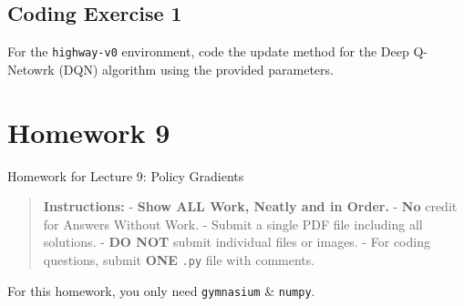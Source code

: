 \documentclass[
  letterpaper,
  DIV=11,
  numbers=noendperiod]{scrreprt}
\makeatletter
\newcommand*\pandocbounded[1]{%
  \sbox\pandoc@box{#1}%
  \Gscale@div\@tempa{\textheight}{\dimexpr\ht\pandoc@box+\dp\pandoc@box\relax}%
  \Gscale@div\@tempb{\linewidth}{\wd\pandoc@box}%
  \ifdim\@tempb\p@<\@tempa\p@\let\@tempa\@tempb\fi%
  \ifdim\@tempa\p@<\p@\scalebox{\@tempa}{\usebox\pandoc@box}%
  \else\usebox{\pandoc@box}%
  \fi%
}
\makeatother
\begin{document}
\section{Coding Exercise 1}\label{coding-exercise-1-5}

For the \texttt{highway-v0} environment, code the update method for the
Deep Q-Netowrk (DQN) algorithm using the provided parameters.

\section{\texorpdfstring{\href{https://colab.research.google.com/drive/1Y_A4uKoSmjc6EmU-Or7tbeo3fe_ZD4RH?usp=sharing}{\protect\pandocbounded{}}}{}}\label{section-6}

\chapter{Homework 9}\label{homework-9}

\begin{tcolorbox}[enhanced jigsaw, colback=white, left=2mm, breakable, opacityback=0, bottomrule=.15mm, rightrule=.15mm, arc=.35mm, colframe=quarto-callout-note-color-frame, leftrule=.75mm, toprule=.15mm]

Homework for Lecture 9: Policy Gradients 📝

\end{tcolorbox}

\begin{quote}
\textbf{Instructions:} - \textbf{Show ALL Work, Neatly and in Order.} -
\textbf{No} credit for Answers Without Work. - Submit a single PDF file
including all solutions. - \textbf{DO NOT} submit individual files or
images. - For coding questions, submit \textbf{ONE} \texttt{.py} file
with comments.
\end{quote}

\begin{tcolorbox}[enhanced jigsaw, opacityback=0, left=2mm, breakable, bottomtitle=1mm, rightrule=.15mm, colframe=quarto-callout-note-color-frame, titlerule=0mm, colback=white, opacitybacktitle=0.6, toptitle=1mm, title=\textcolor{quarto-callout-note-color}{\faInfo}\hspace{0.5em}{Note}, colbacktitle=quarto-callout-note-color!10!white, bottomrule=.15mm, arc=.35mm, coltitle=black, leftrule=.75mm, toprule=.15mm]

For this homework, you only need \texttt{gymnasium} \& \texttt{numpy}.

\end{tcolorbox}
\end{document}

